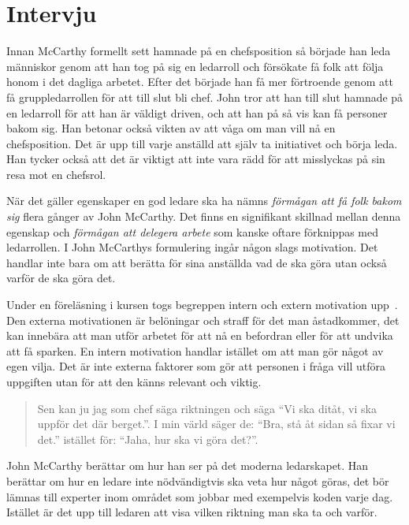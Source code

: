 \section{Intervju}
\label{sec:intervju}

Innan McCarthy formellt sett hamnade på en chefsposition så började han leda människor genom att han tog på sig en ledarroll och försökate få folk att följa honom i det dagliga arbetet. Efter det började han få mer förtroende genom att få gruppledarrollen för att till slut bli chef. John tror att han till slut hamnade på en ledarroll för att han är väldigt driven, och att han på så vis kan få personer bakom sig. Han betonar också vikten av att våga om man vill nå en chefsposition. Det är upp till varje anställd att själv ta initiativet och börja leda. Han tycker också att det är viktigt att inte vara rädd för att misslyckas på sin resa mot en chefsrol.

När det gäller egenskaper en god ledare ska ha nämns \textit{förmågan att få folk bakom sig} flera gånger av John McCarthy. Det finns en signifikant skillnad mellan denna egenskap och \textit{förmågan att delegera arbete} som kanske oftare förknippas med ledarrollen. I John McCarthys formulering ingår någon slags motivation. Det handlar inte bara om att berätta för sina anställda vad de ska göra utan också varför de ska göra det.

Under en föreläsning i kursen togs begreppen intern och extern motivation upp~\citep{motivation}. Den externa motivationen är belöningar och straff för det man åstadkommer, det kan innebära att man utför arbetet för att nå en befordran eller för att undvika att få sparken. En intern motivation handlar istället om att man gör något av egen vilja. Det är inte externa faktorer som gör att personen i fråga vill utföra uppgiften utan för att den känns relevant och viktig.

\begin{quote}
 Sen kan ju jag som chef säga riktningen och säga ``Vi ska ditåt, vi ska uppför det där berget.''. I min värld säger de: ``Bra, stå åt sidan så fixar vi det.'' istället för: ``Jaha, hur ska vi göra det?''.
\end{quote}

John McCarthy berättar om hur han ser på det moderna ledarskapet. Han berättar om hur en ledare inte nödvändigtvis ska veta hur något göras, det bör lämnas till experter inom området som jobbar med exempelvis koden varje dag. Istället är det upp till ledaren att  visa vilken riktning man ska ta och varför.

